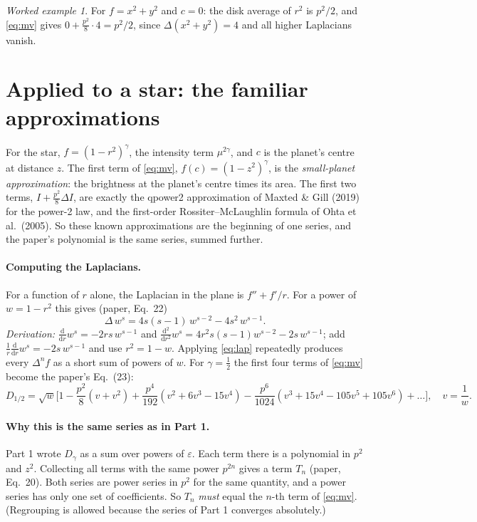 \documentclass[11pt,a4paper]{article}
\theoremstyle{remark}
\newtheorem*{example}{Worked example}
\newcommand{\dd}{\mathrm{d}}
\begin{document}
\begin{example}
For $f=x^2+y^2$ and $c=0$: the disk average of $r^2$ is $p^2/2$, and \eqref{eq:mv} gives
$0+\frac{p^2}{8}\cdot4=p^2/2$, since $\Delta(x^2+y^2)=4$ and all higher Laplacians vanish.
\end{example}

\section{Applied to a star: the familiar approximations}

For the star, $f=(1-r^2)^\gamma$, the intensity term $\mu^{2\gamma}$, and $c$ is the planet's
centre at distance $z$. The first term of \eqref{eq:mv}, $f(c)=(1-z^2)^\gamma$, is the
\emph{small-planet approximation}: the brightness at the planet's centre times its area. The first
two terms, $I+\frac{p^2}{8}\Delta I$, are exactly the qpower2 approximation of Maxted \& Gill
(2019) for the power-2 law, and the first-order Rossiter--McLaughlin formula of Ohta et al.\ (2005).
So these known approximations are the beginning of one series, and the paper's polynomial is the
same series, summed further.

\paragraph{Computing the Laplacians.} For a function of $r$ alone, the Laplacian in the plane is
$f''+f'/r$. For a power of $w=1-r^2$ this gives (paper, Eq.~22)
\begin{equation}
  \Delta\,w^{s}=4s(s-1)\,w^{s-2}-4s^2\,w^{s-1}.
  \label{eq:lap}
\end{equation}
\emph{Derivation:} $\frac{\dd}{\dd r}w^s=-2rs\,w^{s-1}$ and
$\frac{\dd^2}{\dd r^2}w^s=4r^2s(s-1)w^{s-2}-2s\,w^{s-1}$; add $\frac1r\frac{\dd}{\dd r}w^s=-2s\,w^{s-1}$
and use $r^2=1-w$. Applying \eqref{eq:lap} repeatedly produces every $\Delta^nf$ as a short sum of
powers of $w$. For $\gamma=\tfrac12$ the first four terms of \eqref{eq:mv} become the paper's
Eq.~(23):
\[
  D_{1/2}=\sqrt{w}\Big[1-\frac{p^2}{8}(v+v^2)+\frac{p^4}{192}(v^2+6v^3-15v^4)
  -\frac{p^6}{1024}(v^3+15v^4-105v^5+105v^6)+\dots\Big],\quad v=\frac1w .
\]

\paragraph{Why this is the same series as in Part 1.} Part 1 wrote $D_\gamma$ as a sum over
powers of $\varepsilon$. Each term there is a polynomial in $p^2$ and $z^2$. Collecting all terms
with the same power $p^{2n}$ gives a term $T_n$ (paper, Eq.~20). Both series are power series in
$p^2$ for the same quantity, and a power series has only one set of coefficients. So $T_n$
\emph{must} equal the $n$-th term of \eqref{eq:mv}. (Regrouping is allowed because the series of
Part 1 converges absolutely.)
\end{document}
